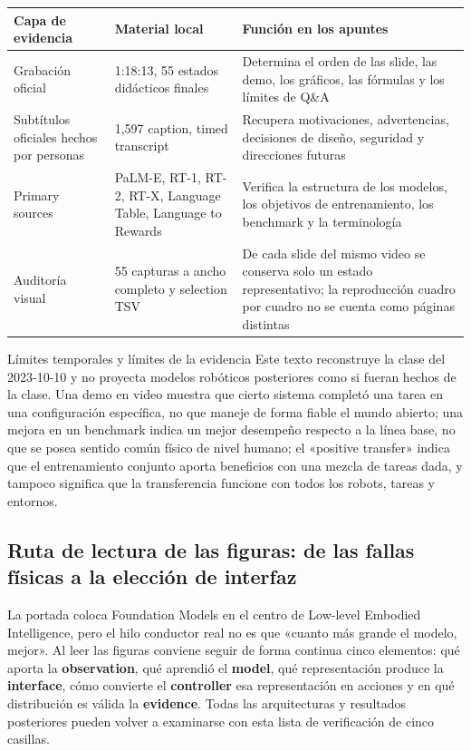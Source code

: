 \begin{longtable}{@{}L{0.18\textwidth}L{0.31\textwidth}L{0.39\textwidth}@{}}
\toprule
Capa de evidencia & Material local & Función en los apuntes \\
\midrule
Grabación oficial & 1:18:13, 55 estados didácticos finales & Determina el orden de las slide, las demo, los gráficos, las fórmulas y los límites de Q\&A \\
Subtítulos oficiales hechos por personas & 1,597 caption, timed transcript & Recupera motivaciones, advertencias, decisiones de diseño, seguridad y direcciones futuras \\
Primary sources & PaLM-E, RT-1, RT-2, RT-X, Language Table, Language to Rewards & Verifica la estructura de los modelos, los objetivos de entrenamiento, los benchmark y la terminología \\
Auditoría visual & 55 capturas a ancho completo y selection TSV & De cada slide del mismo video se conserva solo un estado representativo; la reproducción cuadro por cuadro no se cuenta como páginas distintas \\
\bottomrule
\end{longtable}

\begin{warningbox}{Límites temporales y límites de la evidencia}
Este texto reconstruye la clase del 2023-10-10 y no proyecta modelos robóticos posteriores como si fueran hechos de la clase. Una demo en video muestra que cierto sistema completó una tarea en una configuración específica, no que maneje de forma fiable el mundo abierto; una mejora en un benchmark indica un mejor desempeño respecto a la línea base, no que se posea sentido común físico de nivel humano; el «positive transfer» indica que el entrenamiento conjunto aporta beneficios con una mezcla de tareas dada, y tampoco significa que la transferencia funcione con todos los robots, tareas y entornos.
\end{warningbox}

\subsection{Ruta de lectura de las figuras: de las fallas físicas a la elección de interfaz}

La portada coloca Foundation Models en el centro de Low-level Embodied Intelligence, pero el hilo conductor real no es que «cuanto más grande el modelo, mejor». Al leer las figuras conviene seguir de forma continua cinco elementos: qué aporta la \textbf{observation}, qué aprendió el \textbf{model}, qué representación produce la \textbf{interface}, cómo convierte el \textbf{controller} esa representación en acciones y en qué distribución es válida la \textbf{evidence}. Todas las arquitecturas y resultados posteriores pueden volver a examinarse con esta lista de verificación de cinco casillas.

